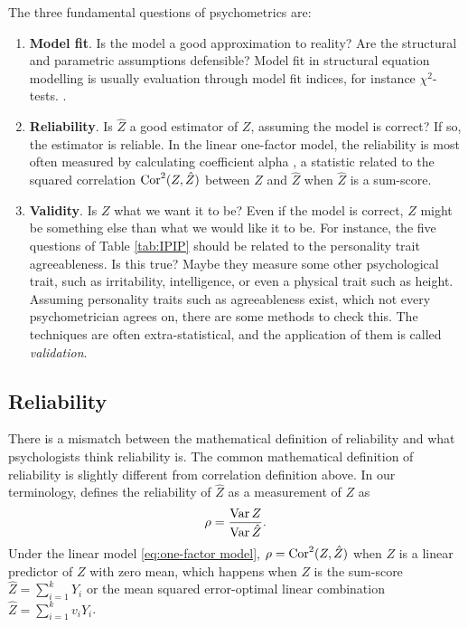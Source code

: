 The three fundamental questions of psychometrics are:
\begin{enumerate}
\item \textbf{Model fit}. Is the model a good approximation to reality? Are the structural and parametric assumptions defensible? Model fit in structural equation modelling is usually evaluation through model fit indices, for instance $\chi^{2}$-tests. \parencite[Chapter 15]{Mulaik2009-gc}.
\item \textbf{Reliability}. Is $\hat{Z}$ a good estimator of $Z$, assuming the model is correct? If so, the estimator is reliable. In the linear one-factor model, the reliability is most often measured by calculating coefficient alpha \parencite{Cronbach1951-in}, a statistic related to the squared correlation $\operatorname{Cor}^{2}(Z,\hat{Z})$ between $Z$ and $\hat{Z}$ when $\hat{Z}$ is a sum-score.
\item \textbf{Validity}. Is $Z$ what we want it to be? Even if the model is correct, $Z$ might be something else than what we would like it to be. For instance, the five questions of Table \ref{tab:IPIP} should be related to the personality trait agreeableness. Is this true? Maybe they measure some other psychological trait, such as irritability, intelligence, or even a physical trait such as height. Assuming personality traits such as agreeableness exist, which not every psychometrician agrees on, there are some methods to check this. The techniques are often extra-statistical, and the application of them is called \emph{validation}. \parencite[Chapter 6]{Borsboom2005-iq}
\end{enumerate}

\subsection{Reliability}

There is a mismatch between the mathematical definition of reliability and what psychologists think reliability is. The common mathematical definition of reliability is slightly different from correlation definition above. In our terminology, \textcite[Equation 3]{Raykov2019-yr} defines the reliability of $\hat{Z}$ as a measurement of $Z$ as
\begin{equation}
\rho=\frac{\operatorname{Var} Z}{\operatorname{Var}\hat{Z}}.\label{eq:rakov-reliabiliy}
\end{equation} Under the linear model \eqref{eq:one-factor model}, $\rho = \operatorname{Cor}^2(Z,\hat{Z})$ when $Z$ is a linear predictor of $Z$ with zero mean, which happens when $Z$ is the sum-score $\hat{Z}=\sum_{i=1}^{k}Y_{i}$ or the mean squared error-optimal linear combination $\hat{Z}=\sum_{i=1}^{k}v_{i}Y_{i}$.


